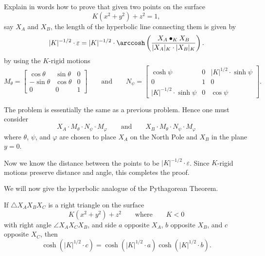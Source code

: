 \documentclass{ximera}
\begin{document}
\begin{problem}
  Explain in words how to prove that given two points on the surface
  \[
  K(x^2 + y^2) + z^2 =1,
  \]
  say $X_A$ and $X_B$, the length of the hyperbolic line connecting them
  is given by
  \[
  |K|^{-1/2}\cdot \varepsilon = |K|^{-1/2} \cdot \arccosh\left(\frac{X_A\bullet_K X_B}{|X_A|_K\cdot |X_B|_K}\right).
  \]
  by using the $K$-rigid motions
  \[
   M_\theta=
  \begin{bmatrix}
    \cos\theta & \sin\theta & 0\\
    -\sin\theta & \cos\theta & 0\\
    0 & 0 & 1
  \end{bmatrix}
  \qquad\text{and}\qquad
 N_\psi=
  \begin{bmatrix}
    \cosh\psi & 0 & |K|^{1/2}\cdot\sinh\psi\\
    0 & 1 & 0\\
    |K|^{-1/2}\cdot\sinh\psi & 0 & \cos\psi
  \end{bmatrix}.
  \]
  \begin{freeResponse}
    The problem is essentially the same as a previous problem. Hence one must consider
    \[
    X_A\cdot M_\theta\cdot N_\psi\cdot M_\varphi \qquad\text{and}\qquad
    X_B\cdot M_\theta\cdot N_\psi\cdot M_\varphi
    \]
    where $\theta$, $\psi$, and $\varphi$ are chosen to place $X_A$ on
    the North Pole and $X_B$ in the plane $y=0$.

    Now we know the distance between the points to be
    $|K|^{-1/2}\cdot\varepsilon$. Since $K$-rigid motions preserve
    distance and angle, this completes the proof.
  \end{freeResponse}
\end{problem}


We will now give the hyperbolic analogue of the Pythagorean Theorem.

\begin{theorem}
  If $\triangle X_AX_BX_C$ is a right triangle on the surface
  \[
  K(x^2+y^2)+z^2\qquad\text{where}\qquad K<0
  \]
  with right angle $\angle X_AX_CX_B$, and side $a$ opposite $X_A$,
  $b$ opposite $X_B$, and $c$ opposite $X_C$, then
  \[
  \cosh\left(|K|^{1/2}\cdot c\right)=\cosh\left(|K|^{1/2}\cdot a\right)\cosh\left(|K|^{1/2}\cdot b\right).
  \]
\end{theorem}
\end{document}
